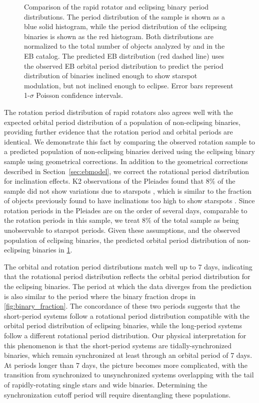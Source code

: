 \documentclass[twocolumn]{aastex6}
\begin{document}
\begin{figure}[htb]
    \centering
    \caption{Comparison of the rapid rotator and eclipsing
    binary period distributions. The period distribution of the 
    \citet{McQuillan14} sample is shown as a blue solid histogram, while the 
    period distribution of the eclipsing binaries is shown as the red 
    histogram. Both distributions are normalized to the total number of 
    objects analyzed by \citet{McQuillan14} and in the EB catalog. The 
    predicted EB distribution (red dashed line) uses the observed EB orbital
    period distribution to predict the period distribution of binaries 
    inclined enough to show starspot modulation, but not inclined enough to 
    eclipse. Error bars represent 1-\(\sigma\) Poisson confidence 
intervals.}\label{fig:eclipseprob}
\end{figure}

The rotation period distribution of rapid rotators also agrees well with the 
expected orbital period distribution of a population of non-eclipsing
binaries, providing further evidence that the rotation period and orbital
periods are identical. We demonstrate this fact by comparing the observed
rotation sample to a predicted population of non-eclipsing binaries derived
using the eclipsing binary sample using geometrical corrections.
In addition to the geometrical
corrections described in Section~\ref{sec:ebmodel}, we correct the rotational 
period distribution for inclination effects. K2 observations of the Pleiades 
found that 8\% of the sample did not show variations due to starspots 
\citep{Rebull17}, which is similar to the fraction of objects previously found 
to have inclinations too high to show starspots \citep{Jackson10}. Since 
rotation periods in the Pleiades are on the order of several days, comparable to 
the rotation periods in this sample, we treat 8\% of the total sample as being 
unobservable to starspot periods. Given these assumptions, and the observed 
population of eclipsing binaries, the predicted orbital period distribution of 
non-eclipsing binaries in \cref{fig:eclipseprob}. 

The orbital and rotation period distributions match well up to 7 days, indicating
that the rotational period distribution reflects the orbital period
distribution for the eclipsing binaries. The period at which the data diverges
from the prediction is also similar to the period where the binary fraction 
drops in \cref{fig:binary_fraction}. The concordance of these two periods 
suggests that the short-period systems follow a rotational period distribution 
compatible with the orbital period distribution of eclipsing binaries, while 
the long-period systems follow a different rotational
period distribution. Our physical interpretation for this phenomenon is that 
the short-period systems are tidally-synchronized binaries, which remain 
synchronized at least through an orbital period of 7 days. At periods longer
than 7 days, the picture becomes more complicated, with the transition from
synchronized to unsynchronized systems overlapping with the tail of
rapidly-rotating single stars and wide binaries. Determining the
synchronization cutoff period will require disentangling these populations.
\end{document}

